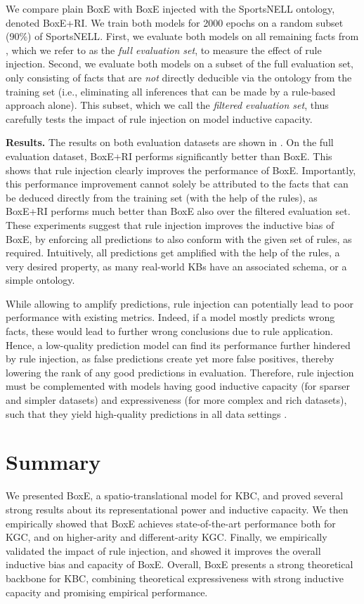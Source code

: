 \documentclass{article}
\begin{document}
We compare plain BoxE with BoxE injected with the SportsNELL ontology, denoted BoxE+RI. We train both models for 2000 epochs on a random subset (90\%) of {SportsNELL}. First, we evaluate both models on all remaining facts from  , which we refer to as the \emph{full evaluation set}, to measure the effect of rule injection. 
Second, we evaluate both models on a subset of the full evaluation set, only consisting of facts that are \emph{not} directly deducible via the ontology from the training set (i.e., eliminating all inferences that can be made by a rule-based approach alone). 
This subset, which we call the \emph{filtered evaluation set},  thus carefully tests the impact of rule injection on model inductive capacity.


\textbf{Results.} The results on both evaluation datasets are shown in . On the full evaluation dataset, BoxE+RI performs significantly better than BoxE. This shows that rule injection clearly improves the performance of BoxE. Importantly, this performance improvement cannot solely be attributed to the facts that can be deduced directly from the training set (with the help of the rules), as BoxE+RI performs much better than BoxE also over the filtered evaluation set. 
These experiments suggest that rule injection improves the inductive bias of BoxE, by enforcing all predictions to also conform with the given set of rules, as required. Intuitively, all predictions get amplified with the help of the rules, a very desired property, as many real-world KBs have an associated schema, or a simple ontology. 

While allowing to amplify predictions, rule injection can potentially lead to poor performance with existing metrics. Indeed, if a model mostly predicts wrong facts, these would lead to further wrong conclusions due to rule application. Hence, a low-quality prediction model can find its performance further hindered by rule injection, as false predictions create yet more false positives, thereby lowering the rank of any good predictions in evaluation. Therefore, rule injection must be complemented with models having good inductive capacity (for sparser and simpler datasets) and expressiveness (for more complex and rich datasets), such that they yield high-quality predictions in all data settings \cite{TrouillonGDB19}.

\section{Summary}
We presented BoxE, a spatio-translational model for KBC, and proved several strong results about its representational power and inductive capacity. We then empirically showed that BoxE achieves state-of-the-art performance both for KGC, and on higher-arity and different-arity KGC. Finally, we empirically validated the impact of rule injection, and showed it improves the overall inductive bias and capacity of BoxE. Overall, BoxE presents a strong theoretical backbone for KBC, combining theoretical expressiveness with strong inductive capacity and promising empirical performance. 
\end{document}
